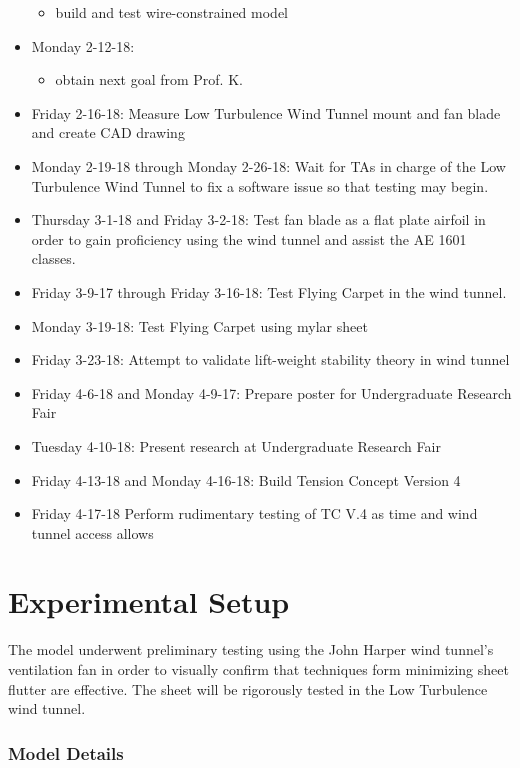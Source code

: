 \documentclass[12pt]{report} %
\begin{document}
\begin{itemize}
\begin{itemize}
    \item build and test wire-constrained model
  \end{itemize}
  \item Monday 2-12-18:
  \begin{itemize}
    \item obtain next goal from Prof. K.
  \end{itemize}
  \item Friday 2-16-18:  Measure Low Turbulence Wind Tunnel mount and fan blade and create CAD drawing
  \item Monday 2-19-18 through Monday 2-26-18:  Wait for TAs in charge of the Low Turbulence Wind Tunnel to
fix a software issue so that testing may begin.
  \item Thursday 3-1-18 and Friday 3-2-18:  Test fan blade as a flat plate airfoil in order to gain proficiency using
the wind tunnel and assist the AE 1601 classes.
  \item Friday 3-9-17 through Friday 3-16-18:  Test Flying Carpet in the wind tunnel.
	\item Monday 3-19-18: Test Flying Carpet using mylar sheet
	\item Friday 3-23-18: Attempt to validate lift-weight stability theory in wind tunnel
	\item Friday 4-6-18 and Monday 4-9-17: Prepare poster for Undergraduate Research Fair
	\item Tuesday 4-10-18: Present research at Undergraduate Research Fair
	\item Friday 4-13-18 and Monday 4-16-18: Build Tension Concept Version 4
	\item Friday 4-17-18 Perform rudimentary testing of TC V.4 as time and wind tunnel access allows
\end{itemize}

\chapter{Experimental Setup}

The model underwent preliminary testing using the John Harper wind tunnel's ventilation fan in order to visually confirm that
techniques form minimizing sheet flutter are effective.  The sheet will be rigorously tested in the Low Turbulence wind tunnel.

\subsection{Model Details}
\end{document}
